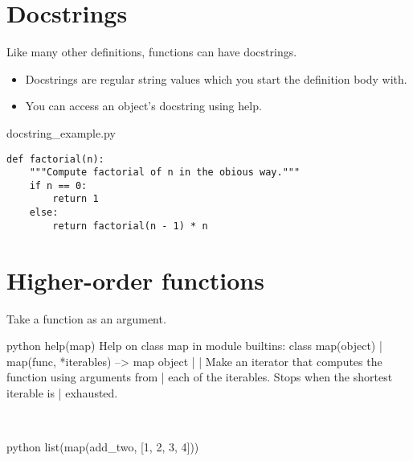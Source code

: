 \documentclass[aspectratio=1610,slidestop]{beamer}
\begin{document}
\section{Docstrings}
\begin{pframe}
 Like many other definitions, functions can have docstrings.
 \begin{itemize}
  \item Docstrings are regular string values which you start the definition
  body with.
  \item You can access an object's docstring using help.
 \end{itemize}
 \begin{pythonfile}{docstring\_example.py}
  \begin{verbatim}
def factorial(n):
    """Compute factorial of n in the obious way."""
    if n == 0:
        return 1
    else:
        return factorial(n - 1) * n
  \end{verbatim}
 \end{pythonfile}
\end{pframe}

\section{Higher-order functions}
\begin{pframe}
 Take a function as an argument.
 \begin{ipython}
  \begin{pythonin}{python}
help(map)
Help on class map in module builtins:
class map(object)
 |  map(func, *iterables) --> map object
 |
 |  Make an iterator that computes the function using arguments from
 |  each of the iterables.  Stops when the shortest iterable is
 |  exhausted.
  \end{pythonin}
  \\

 \begin{pythonin}{python}
list(map(add_two, [1, 2, 3, 4]))
  \end{pythonin}
  \\
  \begin{pythonout}
[3, 4, 5, 6]
  \end{pythonout}
 \end{ipython}
\end{pframe}
\end{document}

